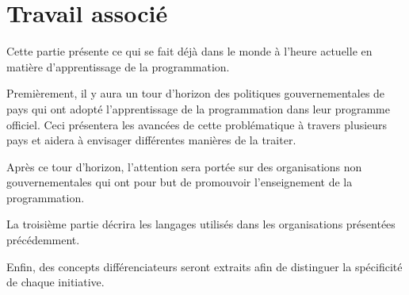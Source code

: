 \chapter{Travail associé}
Cette partie présente ce qui se fait déjà dans le monde à l'heure actuelle en matière d'apprentissage de la programmation.

Premièrement, il y aura un tour d'horizon des politiques gouvernementales de pays qui ont adopté l'apprentissage de la programmation dans leur programme officiel. Ceci présentera les avancées de cette problématique à travers plusieurs pays et aidera à envisager différentes manières de la traiter. 

Après ce tour d'horizon, l'attention sera portée sur des organisations non gouvernementales qui ont pour but de promouvoir l'enseignement de la programmation. 

La troisième partie décrira les langages utilisés dans les organisations présentées précédemment. 

Enfin, des concepts différenciateurs seront extraits afin de distinguer la spécificité de chaque initiative.




